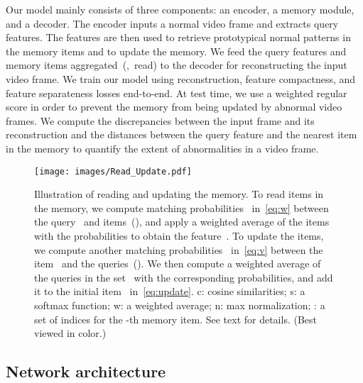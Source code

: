 \documentclass[10pt,twocolumn,letterpaper]{article}
\begin{document}
Our model mainly consists of three components: an encoder, a memory module, and a decoder. The encoder inputs a normal video frame and extracts query features. The features are then used to retrieve prototypical normal patterns in the memory items and to update the memory. We feed the query features and memory items aggregated~(\ie,~read) to the decoder for reconstructing the input video frame. We train our model using reconstruction, feature compactness, and feature separateness losses end-to-end. At test time, we use a weighted regular score in order to prevent the memory from being updated by abnormal video frames. We compute the discrepancies between the input frame and its reconstruction and the distances between the query feature and the nearest item in the memory to quantify the extent of abnormalities in a video frame.


    
 	\begin{figure}[t]
		\centering
			\texttt{[image: images/Read\_Update.pdf]}
\vspace{-0.2cm}
		\caption{Illustration of reading and updating the memory. To read items in the memory, we compute matching probabilities~ in~\eqref{eq:w} between the query~ and items~(), and apply a weighted average of the items with the probabilities to obtain the feature~. To update the items, we compute another matching probabilities~ in~\eqref{eq:v} between the item~ and the queries~(). We then compute a weighted average of the queries in the set~ with the corresponding probabilities, and add it to the initial item~ in~\eqref{eq:update}. c: cosine similarities; s: a softmax function; w: a weighted average; n: max normalization; : a set of indices for the -th memory item. See text for details. (Best viewed in color.)}
		\vspace{-0.3cm}
		\label{fig:memory}
    \end{figure}


    \vspace{-0.1cm}
	\subsection{Network architecture}\label{sec:network}
\vspace{-0.1cm}
\end{document}
